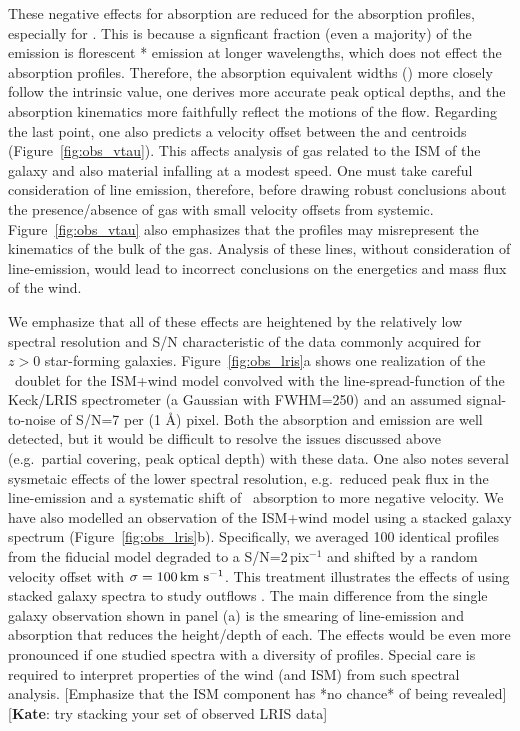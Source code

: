 \documentclass[12pt,preprint]{aastex}
\begin{document}
These negative effects for  absorption are reduced
for the  absorption profiles, especially for \feiia.  This
is because a signficant fraction (even a majority) of the
 emission is florescent * emission at longer
wavelengths, which does not effect the absorption profiles. 
Therefore, the  absorption equivalent widths (\ewabs) more
closely follow the intrinsic value, one derives more accurate peak
optical depths, and the absorption kinematics more faithfully reflect
the motions of the flow.  Regarding the last point, one also
predicts a velocity offset between the  and 
centroids (Figure~\ref{fig:obs_vtau}).
This affects analysis of gas related to the ISM of the galaxy and
also material infalling at a modest speed.  One must take careful
consideration of line emission, therefore,  before drawing robust
conclusions about the presence/absence of gas with small velocity
offsets from systemic. Figure~\ref{fig:obs_vtau} also emphasizes that
the  profiles may misrepresent the kinematics of the bulk of
the gas.  Analysis of these lines, without consideration of
line-emission, would lead to incorrect conclusions on the energetics
and mass flux of the wind.

We emphasize that all of these effects are heightened by the
relatively low spectral resolution and S/N characteristic of the data
commonly acquired for $z>0$ star-forming galaxies.  Figure~\ref{fig:obs_lris}a
shows one realization of the \mgiid\ doublet for the ISM+wind model
convolved with the line-spread-function of the Keck/LRIS spectrometer
(a Gaussian with FWHM=250\kms) and an assumed signal-to-noise of
S/N=7 per (1 \AA) pixel.  Both the absorption
and emission are well detected, but it would be
difficult to resolve the issues discussed above (e.g.\ partial
covering, peak optical depth) with these data.  
One also notes several sysmetaic effects of the lower spectral
resolution, e.g.\ reduced peak flux in the line-emission and a
systematic shift of \mgiia\ absorption to more negative velocity.
We have also modelled an observation of the ISM+wind model using
a stacked galaxy spectrum (Figure~\ref{fig:obs_lris}b).
Specifically, we
averaged 100 identical  profiles from the fiducial model
degraded to a S/N=2\,pix$^{-1}$ and shifted by a random velocity
offset with $\sigma = 100\, {\rm km~s^{-1}}$.  
This treatment illustrates the effects of using stacked galaxy 
spectra to study outflows
\citep[e.g.][]{wcp+09,sato+,rkc+10}.   The main difference from the
single galaxy observation shown in panel (a) is the smearing of
line-emission and absorption that reduces the height/depth of each.
The effects would be even more pronounced if one studied spectra with
a diversity of  profiles.    
Special care is required to interpret properties of the wind (and
ISM) from such spectral analysis.
[Emphasize that the ISM component has *no chance* of being revealed]
[{\bf Kate}: try stacking your set of observed LRIS data]
\end{document}
